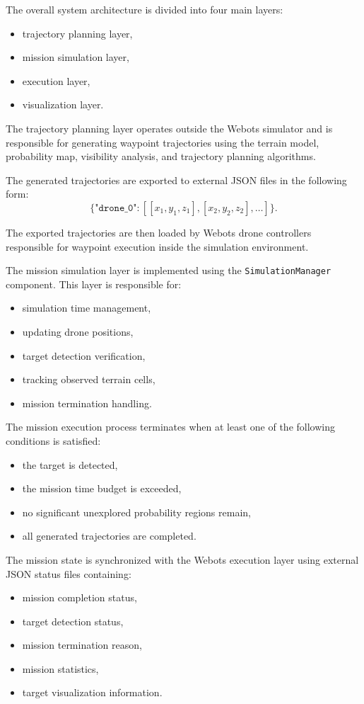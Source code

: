 \documentclass[english]{projectreport}
\begin{document}
The overall system architecture is divided into four main layers:
\begin{itemize}
    \item trajectory planning layer,
    \item mission simulation layer,
    \item execution layer,
    \item visualization layer.
\end{itemize}

The trajectory planning layer operates outside the Webots simulator and is responsible for generating waypoint trajectories using the terrain model, probability map, visibility analysis, and trajectory planning algorithms.

The generated trajectories are exported to external JSON files in the following form:
\[
\{
\texttt{"drone\_0"} : [[x_1,y_1,z_1], [x_2,y_2,z_2], \dots]
\}.
\]

The exported trajectories are then loaded by Webots drone controllers responsible for waypoint execution inside the simulation environment.

The mission simulation layer is implemented using the \texttt{SimulationManager} component. This layer is responsible for:
\begin{itemize}
    \item simulation time management,
    \item updating drone positions,
    \item target detection verification,
    \item tracking observed terrain cells,
    \item mission termination handling.
\end{itemize}

The mission execution process terminates when at least one of the following conditions is satisfied:
\begin{itemize}
    \item the target is detected,
    \item the mission time budget is exceeded,
    \item no significant unexplored probability regions remain,
    \item all generated trajectories are completed.
\end{itemize}

The mission state is synchronized with the Webots execution layer using external JSON status files containing:
\begin{itemize}
    \item mission completion status,
    \item target detection status,
    \item mission termination reason,
    \item mission statistics,
    \item target visualization information.
\end{itemize}
\end{document}
